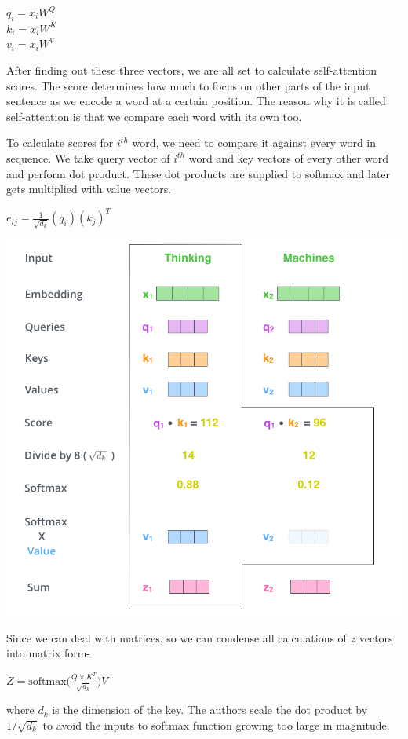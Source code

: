 \documentclass{article}
\begin{document}
\begin{multicols}{2}
\begin{center}
       $q_i = x_iW^Q$ \\
        $k_i = x_iW^K$\\
         $v_i = x_iW^V$
       
\end{center}
After finding out these three vectors, we are all set to calculate self-attention scores. The score determines how much to focus on other parts of the input sentence as we encode a word at a certain position. The reason why it is called self-attention is that we compare each word with its own too.

\noindent To calculate scores for $i^{th}$ word, we need to compare it against every word in sequence. We take query vector of $i^{th}$ word and key vectors of every other word and perform dot product. These dot products are supplied to softmax and later gets multiplied with value vectors.
\begin{center}
       $e_{ij} = \frac{1}{\sqrt{d_k}}(q_i)(k_j)^T$
   \end{center}
   
   
\begin{center}
        \captionsetup{type=figure}
        \includegraphics[width=.40\textwidth]{ZvectorSoftmax.png}
\end{center}


\noindent Since we can deal with matrices, so we can condense all calculations of $z$ vectors into matrix form- 
\begin{center}
$Z = \text{softmax}\Big( \frac{Q\times K^T}{\sqrt{d_k}} \Big)V$\\
\end{center}
where $d_k$ is the dimension of the key. The authors scale the dot product by $1/\sqrt{d_k}$ to avoid the
inputs to softmax function growing too large in magnitude.

\end{multicols}
\end{document}
